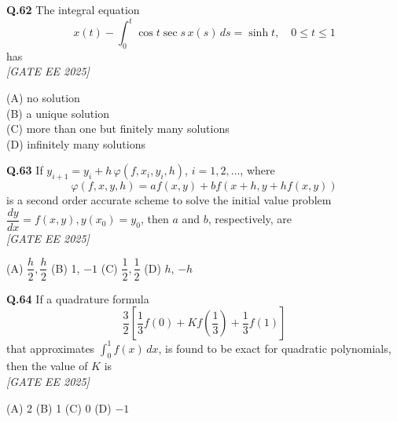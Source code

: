 \documentclass[11pt]{article}
\begin{document}
\begin{flushleft}
\textbf{Q.62} The integral equation 
\[
x(t) - \int_0^t \cos t \sec s \, x(s) \, ds = \sinh t, \quad 0 \leq t \leq 1
\]
has
\\[1ex] \textit{[GATE EE 2025]}

(A) no solution \\
(B) a unique solution \\
(C) more than one but finitely many solutions \\
(D) infinitely many solutions
\end{flushleft}

\begin{flushleft}
\textbf{Q.63} If $y_{i+1} = y_i + h \, \varphi(f, x_i, y_i, h)$, $i = 1, 2, \ldots$, where
\[
\varphi(f, x, y, h) = a f(x, y) + b f(x + h, y + h f(x, y))
\]
is a second order accurate scheme to solve the initial value problem $\dfrac{dy}{dx} = f(x, y), y(x_0) = y_0$, then $a$ and $b$, respectively, are 
\\[1ex] \textit{[GATE EE 2025]}

(A) $\dfrac{h}{2}, \dfrac{h}{2}$ \hspace{2em}
(B) 1, $-1$ \hspace{2em}
(C) $\dfrac{1}{2}, \dfrac{1}{2}$ \hspace{2em}
(D) $h$, $-h$
\end{flushleft}

\begin{flushleft}
\textbf{Q.64} If a quadrature formula
\[
\frac{3}{2} \left[ \frac{1}{3} f(0) + K f\left( \frac{1}{3} \right) + \frac{1}{3} f(1) \right]
\]
that approximates $\int_0^1 f(x) \, dx$, is found to be exact for quadratic polynomials, then the value of $K$ is 
\\[1ex] \textit{[GATE EE 2025]}

(A) 2 \hspace{2em} (B) 1 \hspace{2em} (C) 0 \hspace{2em} (D) $-1$
\end{flushleft}
\end{document}
